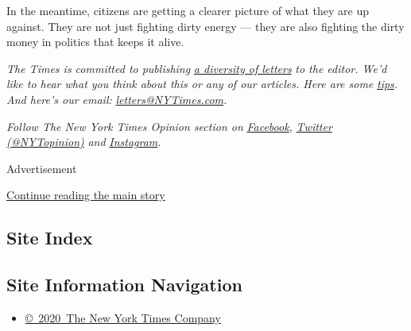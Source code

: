 In the meantime, citizens are getting a clearer picture of what they are
up against. They are not just fighting dirty energy --- they are also
fighting the dirty money in politics that keeps it alive.

\emph{The Times is committed to publishing}
\href{https://www.nytimes3xbfgragh.onion/2019/01/31/opinion/letters/letters-to-editor-new-york-times-women.html}{\emph{a
diversity of letters}} \emph{to the editor. We'd like to hear what you
think about this or any of our articles. Here are some}
\href{https://help.nytimes3xbfgragh.onion/hc/en-us/articles/115014925288-How-to-submit-a-letter-to-the-editor}{\emph{tips}}\emph{.
And here's our email:}
\href{mailto:letters@NYTimes.com}{\emph{letters@NYTimes.com}}\emph{.}

\emph{Follow The New York Times Opinion section on}
\href{https://www.facebookcorewwwi.onion/nytopinion}{\emph{Facebook}}\emph{,}
\href{http://twitter.com/NYTOpinion}{\emph{Twitter (@NYTopinion)}}
\emph{and}
\href{https://www.instagram.com/nytopinion/}{\emph{Instagram}}\emph{.}

Advertisement

\protect\hyperlink{after-bottom}{Continue reading the main story}

\hypertarget{site-index}{%
\subsection{Site Index}\label{site-index}}

\hypertarget{site-information-navigation}{%
\subsection{Site Information
Navigation}\label{site-information-navigation}}

\begin{itemize}
\tightlist
\item
  \href{https://help.nytimes3xbfgragh.onion/hc/en-us/articles/115014792127-Copyright-notice}{©~2020~The
  New York Times Company}
\end{itemize}

